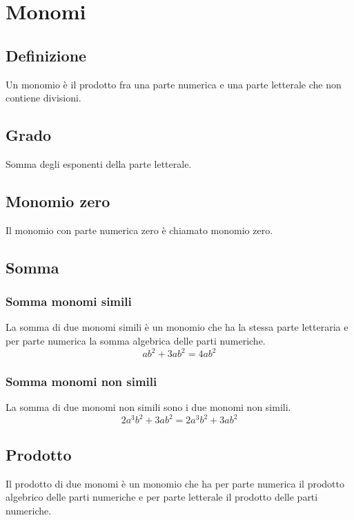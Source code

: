\chapter{Monomi}
\section{Definizione}
Un monomio è il prodotto fra una parte numerica e una parte letterale che non contiene divisioni.
\section{Grado} 
Somma degli esponenti della parte letterale.
\section{Monomio zero}
Il monomio con parte numerica zero è chiamato monomio zero.
\section{Somma}
\subsection{Somma monomi simili}
La somma di due monomi simili è un monomio che ha la stessa parte letteraria e per parte numerica la somma algebrica delle parti numeriche.
\begin{equation}
ab^2+3ab^2=4ab^2
\end{equation}
\subsection{Somma monomi non simili}
La somma di due monomi non simili  sono i due monomi non simili.
\begin{equation}
2a^3b^2+3ab^2=2a^3b^2+3ab^2
\end{equation}
\section{Prodotto}
Il prodotto di due monomi è un monomio che ha per parte numerica il prodotto algebrico delle parti numeriche e per parte letterale il prodotto delle parti numeriche.